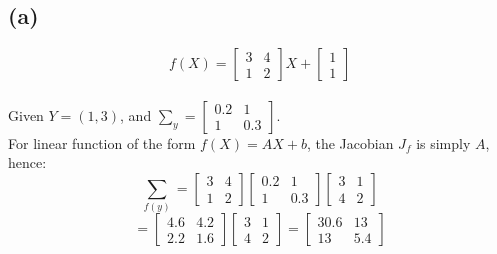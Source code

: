 \documentclass{article}
\begin{document}
\subsection*{(a)}
\[ f(X) = \begin{bmatrix} 3 & 4 \\ 1 & 2 \end{bmatrix} X + \begin{bmatrix} 1 \\ 1 \end{bmatrix} \]
\\
Given $Y = (1,3)$, and $\sum_y = \begin{bmatrix} 0.2 & 1 \\ 1 & 0.3 \end{bmatrix}$.
\\
For linear function of the form $f(X) = AX + b$, the Jacobian $J_f$ is simply $A$, hence:
\[ \sum_{f(y)} = \begin{bmatrix} 3 & 4 \\ 1 & 2 \end{bmatrix} \begin{bmatrix} 0.2 & 1 \\ 1 & 0.3 \end{bmatrix} \begin{bmatrix} 3 & 1 \\ 4 & 2 \end{bmatrix} \]
\[ = \begin{bmatrix} 4.6 & 4.2 \\ 2.2 & 1.6 \end{bmatrix} \begin{bmatrix} 3 & 1 \\ 4 & 2 \end{bmatrix} = \begin{bmatrix} 30.6 & 13 \\ 13 & 5.4 \end{bmatrix} \]
\end{document}
